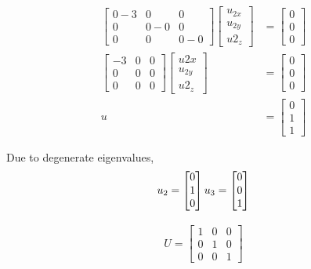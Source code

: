 \documentclass[11pt,letterpaper]{article}
\begin{document}
\begin{enumerate}
\begin{align*}
    \begin{bmatrix}
        0-3 & 0 & 0 \\
        0 & 0-0 & 0 \\
        0 & 0 & 0-0
    \end{bmatrix}
    \begin{bmatrix}
        u_{2x} \\ u_{2y} \\ u2_z
    \end{bmatrix}
    &= \begin{bmatrix}
        0 \\ 0 \\ 0
    \end{bmatrix} \\
    \begin{bmatrix}
        -3 & 0 & 0 \\
        0 & 0 & 0 \\
        0 & 0 & 0
    \end{bmatrix}
    \begin{bmatrix}
        u2x \\ u_{2y} \\ u2_z
    \end{bmatrix}
    &= \begin{bmatrix}
        0 \\ 0 \\ 0
    \end{bmatrix} \\
    u
    &= \begin{bmatrix}
        0 \\ 1 \\ 1
    \end{bmatrix}
\end{align*}

Due to degenerate eigenvalues,
\begin{align*}
    u_2
    = \begin{bmatrix}
        0 \\ 1 \\ 0
    \end{bmatrix}
    \hfill
    u_3
    = \begin{bmatrix}
        0 \\ 0 \\ 1
    \end{bmatrix} \\
\end{align*}

\begin{align*}
U = {\begin{bmatrix}
        1 & 0 & 0 \\
        0 & 1 & 0 \\
        0 & 0 & 1
    \end{bmatrix}}
\end{align*}


\end{enumerate}
\end{document}
